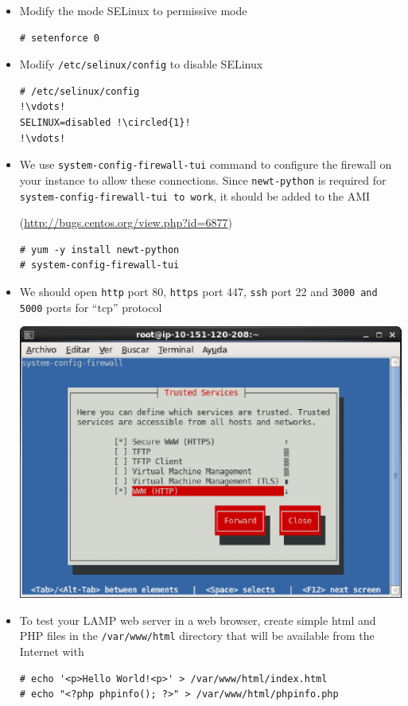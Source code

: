 \documentclass{beamer}
\newcommand*\circled[1]{\tikz[baseline=(char.base)]{
            \node[shape=circle,draw,inner sep=2pt] (char) {#1};}}
\newcommand{\outputcommand}[1]{\color{darkgreen}{#1}}
\begin{document}
\begin{frame}
\begin{itemize}
\lstset{language=shell}
\begin{lstlisting}[escapechar=!]
# chkconfig --list httpd
!\outputcommand{httpd           0:off   1:off   2:on    3:on    4:on    5:on    6:off}
\end{lstlisting}

\item Modify the mode SELinux to permissive mode
\lstset{language=shell}
\begin{lstlisting}[escapechar=!]
# setenforce 0
\end{lstlisting}

\item Modify \texttt{/etc/selinux/config} to disable SELinux

\lstset{language=shell}
\begin{lstlisting}[escapechar=!]
# /etc/selinux/config
!\vdots!
SELINUX=disabled !\circled{1}!
!\vdots!
\end{lstlisting}

\item We use \texttt{system-config-firewall-tui} command to configure the firewall on your instance to allow these connections. 
Since \texttt{newt-python} is required for \texttt{system-config-firewall-tui to work}, it should be added to the AMI

(\href{http://bugs.centos.org/view.php?id=6877}{http://bugs.centos.org/view.php?id=6877})
\lstset{language=shell}
\begin{lstlisting}[escapechar=!]
# yum -y install newt-python 
# system-config-firewall-tui
\end{lstlisting}

\item We should open \texttt{http} port 80, \texttt{https} port 447,  \texttt{ssh} port 22 and \texttt{\alert{3000 and 5000}} ports for ``tcp'' protocol
 
\includegraphics[width=0.5 \textwidth]{system-config-firewall-tui.eps}

\item To test your LAMP web server in a web browser,  create simple html and PHP files in the \texttt{/var/www/html} directory that will be available from the Internet with
\lstset{language=shell}
\begin{lstlisting}[escapechar=&]
# echo '<p>Hello World!<p>' > /var/www/html/index.html
# echo "<?php phpinfo(); ?>" > /var/www/html/phpinfo.php
\end{lstlisting}



\end{itemize}
\end{frame}
\end{document}

